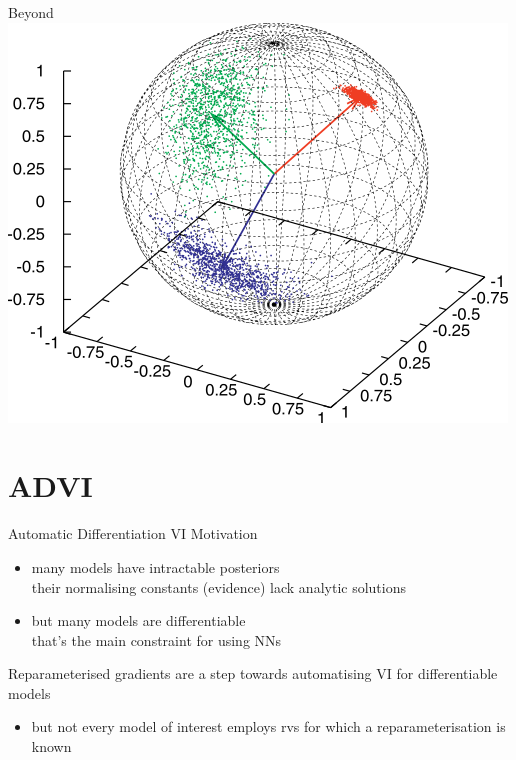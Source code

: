 \documentclass[14pt,dvipsnames]{beamer}
\begin{document}
\begin{frame}{Beyond}
{		\includegraphics[scale=0.3]{densities/spherical}
	}
	

\end{frame}

\section{ADVI}

\begin{frame}{Automatic Differentiation VI}
	Motivation
	\begin{itemize}
		\item many models have intractable posteriors\\
		their normalising constants (evidence) lack analytic solutions \pause
		\item but many models are differentiable\\
		that's the main constraint for using NNs \pause
	\end{itemize}

	Reparameterised gradients are a step towards automatising VI for differentiable models \pause
	\begin{itemize}
		\item but not every model of interest employs rvs for which a reparameterisation is known %
	\end{itemize}
	
\end{frame}
\end{document}
